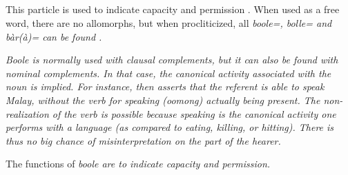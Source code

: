 \subsection{}\label{sec:wc:boole}
This particle is used to indicate capacity  and permission  \citep[174]{SmithEtAl2006cll}. When used as a free word, there are no allomorphs, but when procliticized, all \em boole=, bolle= \em and \em bàr(à)= \em can be found \citep[cf.][139]{Slomanson2006cll}.






\em Boole \em is normally used with clausal complements, but it can also be found with nominal complements. In that case, the canonical activity associated with the noun is implied. For instance,  then asserts that the referent is able to speak Malay, without the verb for speaking (\em oomong\em) actually being present. The non-realization of the verb is possible because speaking is the canonical activity one performs with a language (as compared to eating, killing, or hitting). There is thus no big chance of misinterpretation on the part of the hearer.


% 
% 

The functions of \em boole \em are to indicate capacity and permission.

